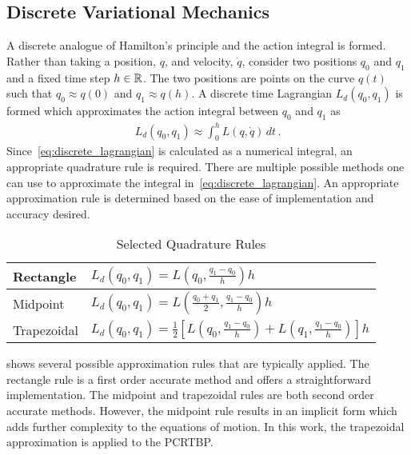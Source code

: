 \documentclass[letterpaper, paper,11pt]{AAS}		%
\begin{document}
\subsection{Discrete Variational Mechanics}
A discrete analogue of Hamilton's principle and the action integral is formed.
Rather than taking a position, \( q \), and velocity, \( \dot{q} \), consider two positions \( q_0 \) and \( q_1 \) and a fixed time step \( h \in \mathbb{R} \).
The two positions are points on the curve \( q(t) \) such that \( q_0 \approx q(0) \) and \( q_1 \approx q(h) \).
A discrete time Lagrangian \( L_d( q_0, q_1) \) is formed which approximates the action integral between \( q_0 \) and \( q_1 \) as 
\begin{align}\label{eq:discrete_lagrangian}
	L_d\left( q_0 , q_1 \right) \approx \int_{0}^{h} L \left( q , \dot{q} \right) \, dt \, .
\end{align}
Since~\cref{eq:discrete_lagrangian} is calculated as a numerical integral, an appropriate quadrature rule is required.
There are multiple possible methods one can use to approximate the integral in~\cref{eq:discrete_lagrangian}.
An appropriate approximation rule is determined based on the ease of implementation and accuracy desired.
\begin{table}[htbp]
\caption{Selected Quadrature Rules\label{tab:quadrature}}
\begin{center}
\begin{tabular}{l|l}Rectangle & \( L_d(q_0,q_1) =L(q_0,\frac{q_1-q_0}{h}) h \)  \\ \hline
Midpoint & \( L_d(q_0,q_1) = L(\frac{q_0 + q_1}{2},\frac{q_1 - q_0}{h}) h \) \\ \hline
Trapezoidal & \( L_d(q_0, q_1) = \frac{1}{2} \left[ L(q_0, \frac{q_1 - q_0}{h} ) + L(q_1, \frac{q_1 - q_0 }{h} )\right] h \)
\end{tabular} 
\end{center}
\end{table}
 shows several possible approximation rules that are typically applied.
The rectangle rule is a first order accurate method and offers a straightforward implementation.
The midpoint and trapezoidal rules are both second order accurate methods. 
However, the midpoint rule results in an implicit form which adds further complexity to the equations of motion.
In this work, the trapezoidal approximation is applied to the PCRTBP.
\end{document}
